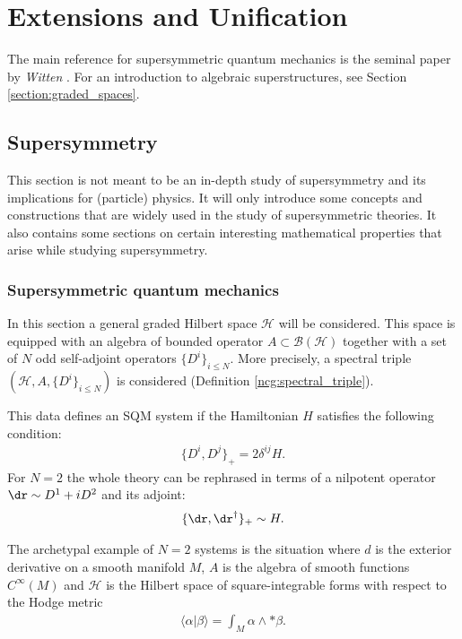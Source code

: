 \chapter{Extensions and Unification}\label{chapter:unification}

    The main reference for supersymmetric quantum mechanics is the seminal paper by \textit{Witten} \cite{witten_morse}. For an introduction to algebraic superstructures, see Section \ref{section:graded_spaces}.

\section{Supersymmetry}

    This section is not meant to be an in-depth study of supersymmetry and its implications for (particle) physics. It will only introduce some concepts and constructions that are widely used in the study of supersymmetric theories. It also contains some sections on certain interesting mathematical properties that arise while studying supersymmetry.

\subsection{Supersymmetric quantum mechanics}

    In this section a general graded Hilbert space $\mathcal{H}$ will be considered. This space is equipped with an algebra of bounded operator $A\subset\mathcal{B}(\mathcal{H})$ together with a set of $N$ odd self-adjoint operators $\{D^i\}_{i\leq N}$. More precisely, a spectral triple $(\mathcal{H},A,\{D^i\}_{i\leq N})$ is considered (Definition \ref{ncg:spectral_triple}).

    This data defines an SQM system if the Hamiltonian $H$ satisfies the following condition:
    \begin{gather}
        \{D^i,D^j\}_+ = 2\delta^{ij}H.
    \end{gather}
    For $N=2$ the whole theory can be rephrased in terms of a nilpotent operator $\dr\sim D^1+iD^2$ and its adjoint:
    \begin{gather}
        \{\dr,\dr^\dagger\}_+\sim H.
    \end{gather}

    \begin{example}
        The archetypal example of $N=2$ systems is the situation where $d$ is the exterior derivative on a smooth manifold $M$, $A$ is the algebra of smooth functions $C^\infty(M)$ and $\mathcal{H}$ is the Hilbert space of square-integrable forms with respect to the Hodge metric
        \begin{gather}
            \langle\alpha|\beta\rangle = \int_M\alpha\wedge\ast\beta.
        \end{gather}
    \end{example}


